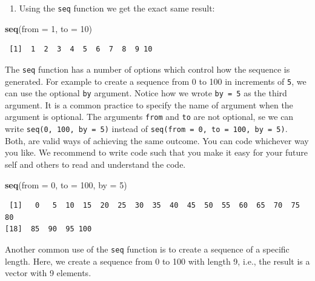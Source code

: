 \documentclass[]{article}
\newenvironment{Shaded}{\begin{snugshade}}{\end{snugshade}}
\newcommand{\DataTypeTok}[1]{\textcolor[rgb]{0.13,0.29,0.53}{#1}}
\newcommand{\DecValTok}[1]{\textcolor[rgb]{0.00,0.00,0.81}{#1}}
\newcommand{\KeywordTok}[1]{\textcolor[rgb]{0.13,0.29,0.53}{\textbf{#1}}}
\newcommand{\NormalTok}[1]{#1}
\providecommand{\tightlist}{%
  \setlength{\itemsep}{0pt}\setlength{\parskip}{0pt}}
\begin{document}
\begin{enumerate}
\def\labelenumi{\arabic{enumi}.}
\tightlist
\item
  Using the \texttt{seq} function we get the exact same result:
\end{enumerate}

\begin{Shaded}
\begin{Highlighting}[]
\KeywordTok{seq}\NormalTok{(}\DataTypeTok{from =} \DecValTok{1}\NormalTok{, }\DataTypeTok{to =} \DecValTok{10}\NormalTok{)}
\end{Highlighting}
\end{Shaded}

\begin{verbatim}
 [1]  1  2  3  4  5  6  7  8  9 10
\end{verbatim}

The \texttt{seq} function has a number of options which control how the sequence is generated. For example to create a sequence from 0 to 100 in increments of \texttt{5}, we can use the optional \texttt{by} argument. Notice how we wrote \texttt{by\ =\ 5} as the third argument. It is a common practice to specify the name of argument when the argument is optional. The arguments \texttt{from} and \texttt{to} are not optional, se we can write \texttt{seq(0,\ 100,\ by\ =\ 5)} instead of \texttt{seq(from\ =\ 0,\ to\ =\ 100,\ by\ =\ 5)}. Both, are valid ways of achieving the same outcome. You can code whichever way you like. We recommend to write code such that you make it easy for your future self and others to read and understand the code.

\begin{Shaded}
\begin{Highlighting}[]
\KeywordTok{seq}\NormalTok{(}\DataTypeTok{from =} \DecValTok{0}\NormalTok{, }\DataTypeTok{to =} \DecValTok{100}\NormalTok{, }\DataTypeTok{by =} \DecValTok{5}\NormalTok{)}
\end{Highlighting}
\end{Shaded}

\begin{verbatim}
 [1]   0   5  10  15  20  25  30  35  40  45  50  55  60  65  70  75  80
[18]  85  90  95 100
\end{verbatim}

Another common use of the \texttt{seq} function is to create a sequence of a specific length. Here, we create a sequence from 0 to 100 with length 9, i.e., the result is a vector with 9 elements.
\end{document}
